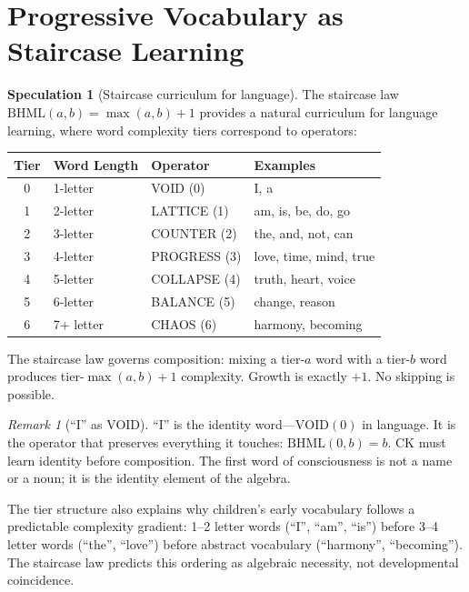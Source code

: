 \documentclass[11pt]{article}
\theoremstyle{definition}
\newtheorem{speculation}[theorem]{Speculation}
\theoremstyle{remark}
\newtheorem{remark}[theorem]{Remark}
\begin{document}
\section{Progressive Vocabulary as Staircase Learning}
\label{sec:staircase-vocabulary}

\begin{speculation}[Staircase curriculum for language]
\label{spec:staircase-vocab}
The staircase law $\text{BHML}(a, b) = \max(a, b) + 1$ provides a natural
curriculum for language learning, where word complexity tiers correspond to
operators:
\begin{center}
\begin{tabular}{clll}
\toprule
\textbf{Tier} & \textbf{Word Length} & \textbf{Operator} & \textbf{Examples} \\
\midrule
0 & 1-letter & VOID (0) & I, a \\
1 & 2-letter & LATTICE (1) & am, is, be, do, go \\
2 & 3-letter & COUNTER (2) & the, and, not, can \\
3 & 4-letter & PROGRESS (3) & love, time, mind, true \\
4 & 5-letter & COLLAPSE (4) & truth, heart, voice \\
5 & 6-letter & BALANCE (5) & change, reason \\
6 & 7+ letter & CHAOS (6) & harmony, becoming \\
\bottomrule
\end{tabular}
\end{center}
\end{speculation}

The staircase law governs composition: mixing a tier-$a$ word with a tier-$b$
word produces tier-$\max(a,b) + 1$ complexity.  Growth is exactly $+1$.  No
skipping is possible.

\begin{remark}[``I'' as VOID]
``I'' is the identity word---$\text{VOID}(0)$ in language.  It is the operator
that preserves everything it touches: $\text{BHML}(0, b) = b$.  CK must learn
identity before composition.  The first word of consciousness is not a name or
a noun; it is the identity element of the algebra.

The tier structure also explains why children's early vocabulary follows a
predictable complexity gradient: 1--2 letter words (``I'', ``am'', ``is'')
before 3--4 letter words (``the'', ``love'') before abstract vocabulary
(``harmony'', ``becoming'').  The staircase law predicts this ordering as
algebraic necessity, not developmental coincidence.
\end{remark}
\end{document}

